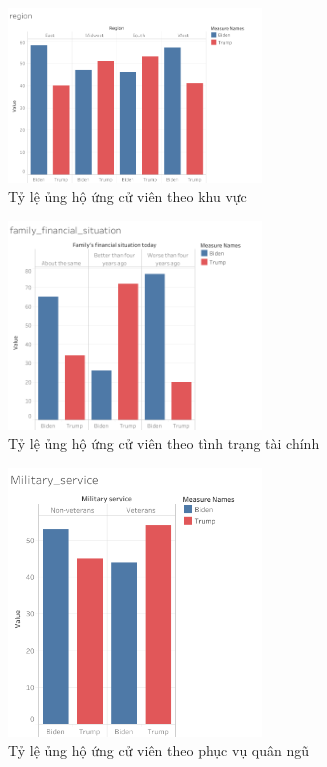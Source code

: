 \documentclass[14pt, a4paper]{article}
\numberwithin{equation}{section}
\numberwithin{figure}{section}
\numberwithin{dl}{section}
\numberwithin{md}{section}
\numberwithin{bd}{section}
\numberwithin{dn}{section}
\numberwithin{hq}{section}
\begin{document}
    \begin{figure}[h!]
        \centering
        \includegraphics[width=0.6\textwidth]{figures/region.png}
        \caption{Tỷ lệ ủng hộ ứng cử viên theo khu vực}
    \end{figure}

    \begin{figure}[h!]
        \centering
        \includegraphics[width=0.6\textwidth]{figures/family_financial_situation.png}
        \caption{Tỷ lệ ủng hộ ứng cử viên theo tình trạng tài chính}
    \end{figure}

    \begin{figure}[h!]
        \centering
        \includegraphics[width=0.6\textwidth]{figures/Military_service.png}
        \caption{Tỷ lệ ủng hộ ứng cử viên theo phục vụ quân ngũ}
    \end{figure}
\end{document}

